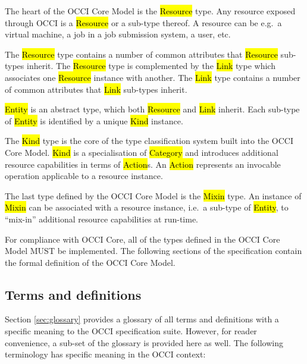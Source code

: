 \documentclass[10pt,a4paper]{article}
\begin{document}
The heart of the OCCI Core Model is the \hl{Resource} type. Any
resource exposed through OCCI is a \hl{Resource} or a sub-type
thereof.  A resource can be e.g.~a virtual machine, a job in a job
submission system, a user, etc.

The \hl{Resource} type contains a number of common attributes that
\hl{Resource} sub-types inherit. The \hl{Resource} type is
complemented by the \hl{Link} type which associates one \hl{Resource}
instance with another.
%
The \hl{Link} type contains a number of common attributes that
\hl{Link} sub-types inherit.

\hl{Entity} is an abstract type, which both \hl{Resource} and \hl{Link}
inherit.  Each sub-type of \hl{Entity} is identified by a unique
\hl{Kind} instance.

The \hl{Kind} type is the core of the type classification system built
into the OCCI Core Model. \hl{Kind} is a specialisation of
\hl{Category} and introduces additional resource capabilities in terms
of \hl{Action}s.  An \hl{Action} represents an invocable operation
applicable to a resource instance.

The last type defined by the OCCI Core Model is the \hl{Mixin}
type. An instance of \hl{Mixin} can be associated with a resource
instance, i.e.~a sub-type of \hl{Entity}, to ``mix-in'' additional
resource capabilities at run-time.

For compliance with OCCI Core, all of the types defined in the OCCI
Core Model MUST be implemented.  The following sections of the
specification contain the formal definition of the OCCI Core Model.

\subsection{Terms and definitions}
Section \ref{sec:glossary} provides a glossary of all terms and
definitions with a specific meaning to the OCCI specification
suite. However, for reader convenience, a sub-set of the glossary is
provided here as well. The following terminology has specific meaning
in the OCCI context:
\end{document}
